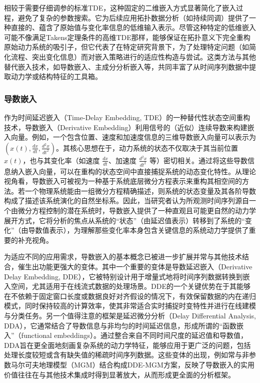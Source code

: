 相较于需要仔细调参的标准TDE，这种固定的二维嵌入方式显著简化了嵌入过程，避免了复杂的参数搜索。它为后续应用拓扑数据分析（如持续同调）提供了一种直接的、蕴含了原始值与变化率信息的低维输入表示。尽管这种特定的低维嵌入可能不像满足Takens定理条件的高维TDE那样，能够保证在拓扑意义下完全重构原始动力系统的吸引子，但它代表了在特定研究背景下，为了处理特定问题（如简化流程、突出变化信息）而对嵌入策略进行的适应性构造与尝试。这类方法与其他替代嵌入技术，如导数嵌入、主成分分析嵌入等，共同丰富了从时间序列数据中提取动力学或结构特征的工具箱。

\subsubsection{导数嵌入}
作为时间延迟嵌入（Time-Delay Embedding, TDE）的一种替代性状态空间重构技术，导数嵌入（Derivative Embedding）利用信号的（近似）连续导数来构建嵌入向量。例如，一个包含位置、速度和加速度信息的三维导数嵌入向量可以表示为 $(x(t), \frac{dx}{dt}, \frac{d^2x}{dt^2})$。其核心思想在于，动力系统的状态不仅取决于其当前位置 $x(t)$，也与其变化率（如速度 $\frac{dx}{dt}$、加速度 $\frac{d^2x}{dt^2}$ 等）密切相关。通过将这些导数信息纳入嵌入向量，可以在重构的状态空间中直接捕捉系统的动态变化特性。从理论视角看，导数嵌入可被视为一种基于系统底层微分方程表示来重构其相空间的方法。若一个物理系统能由一组微分方程精确描述，则系统的状态变量及其各阶导数构成了描述该系统演化的自然坐标系。因此，当研究者认为所观测时间序列源自一个由微分方程控制的潜在系统时，导数嵌入提供了一种直观且可能更自然的动力学展开方式，它将分析的焦点从系统的“状态”（由延迟值表示）转移到了系统的“变化”（由导数值表示），为理解那些变化率本身包含关键信息的系统动力学提供了重要的补充视角。

为适应不同的应用需求，导数嵌入的基本概念已被进一步扩展并常与其他技术结合，催生出功能更强大的变体。其中一个重要的变体是导数延迟嵌入（Derivative Delay Embedding, DDE），它被特别设计用于增量式地将时间序列数据转换到嵌入空间，尤其适用于在线流式数据的处理场景。DDE的一个关键优势在于其能够在不依赖于固定窗口长度或数据良好对齐假设的情况下，有效保留数据的内在递归模式，同时保持较高的计算效率，使其非常适合实时捕捉时变特性并进行在线建模与分类任务。另一个值得注意的框架是延迟微分分析（Delay Differential Analysis, DDA），它通常结合了导数信息与非均匀的时间延迟信息，形成所谓的“函数嵌入”（functional embeddings）。通过整合来自不同时间尺度的延迟值和导数值，DDA旨在更全面地刻画复杂系统的动力学特征，能够应用于更广泛的问题，包括处理长度较短或含有缺失值的稀疏时间序列数据。这些变体的出现，例如常与非参数马尔可夫地理模型（MGM）结合构成DDE-MGM方案，反映了导数嵌入的实用价值往往在与其他技术集成时得到显著放大，从而形成更全面的分析框架。

